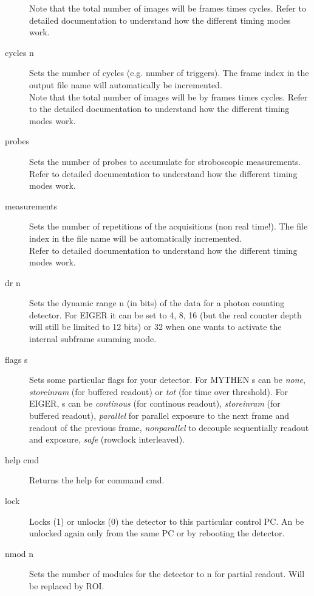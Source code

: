 \documentclass{article}
\newcommand{\E}{EIGER\xspace}
\begin{document}
\begin{description}
Note that the total number of images will be  frames times cycles.  Refer to detailed documentation to understand how the different timing modes work. 
\item[cycles n] 
Sets the number of cycles (e.g. number of triggers). The frame index in the output file name will automatically be incremented. \\ 
Note that the total number of images will be by frames times cycles.   Refer to the detailed documentation to understand how the different timing modes work.
\item[probes]  Sets the number of probes to accumulate for stroboscopic measurements. \\
Refer to detailed documentation to understand how the different timing modes work.
\item[measurements] Sets the number of repetitions of the acquisitions (non real time!). The file index in the file name will be automatically incremented.\\
Refer to detailed documentation to understand how the different timing modes work.
\item[dr n] Sets the dynamic range n (in bits) of the data for a photon counting detector. For \E it can be set to 4, 8, 16 (but the real counter depth will still be limited to 12 bits) or 32 when one wants to activate the internal subframe summing mode.

\item[flags s] Sets some particular flags for your detector. For MYTHEN s can be \textit{none}, \textit{storeinram} (for buffered readout) or \textit{tot} (for time over threshold). For \E, s can be {\it{continous}} (for continous readout), \textit{storeinram} (for buffered readout), \textit{parallel} for parallel exposure to the next frame and readout of the previous frame, \textit{nonparallel} to decouple sequentially readout and exposure, \textit{safe} (rowclock interleaved).  
\item[help cmd]  Returns the help for command cmd.
\item[lock] Locks (1) or unlocks (0) the detector to this particular control PC. An be unlocked again only from the same PC or by rebooting the detector.
\item[nmod n] Sets the number of modules for the detector to n for partial readout. Will be replaced by ROI.
\end{description}
\end{document}
